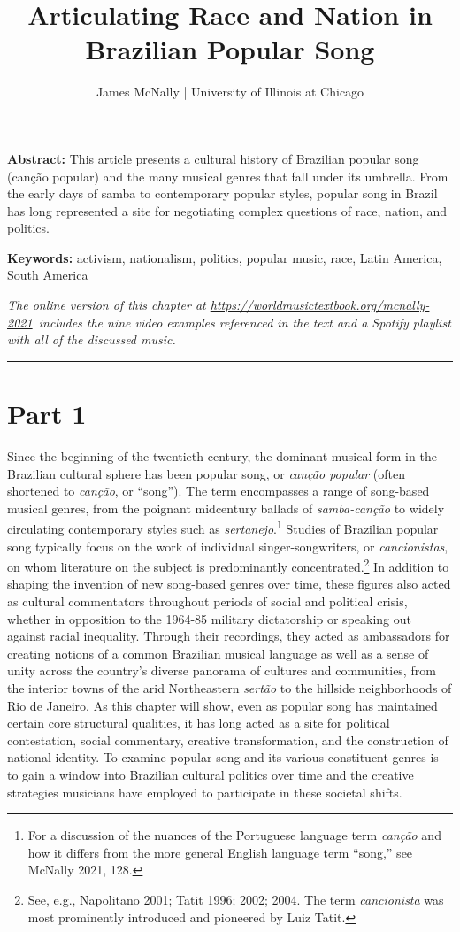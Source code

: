 \documentclass[twoside]{article}
\title{Articulating Race and Nation in Brazilian Popular Song}
\author{James McNally | University of Illinois at Chicago}
\date{}
\makeatletter
\renewcommand{\maketitle}{\bgroup\setlength{\parindent}{0pt}
\begin{flushleft}
  \vspace*{3\baselineskip}
  \huge{\textbf{\@title}}

  \medskip
  
  \large{\@author}
\end{flushleft}\egroup
}
\providecommand{\abstracttext}[1]
{
  \noindent
  \textbf{Abstract:} #1
}
\providecommand{\keywords}[1]
{
  \newline
  \textbf{Keywords:} #1
}
\providecommand{\wmturl}{\href{https://worldmusictextbook.org/mcnally-2021}{https://worldmusictextbook.org/mcnally-2021}}
\providecommand{\wmturltext}{
  \noindent\emph{The online version of this chapter at \wmturl~includes the nine video examples referenced in the text and a Spotify playlist with all of the discussed music.}
}
\makeatother
\begin{document}
\suppressfloats %
\maketitle

\abstracttext{This article presents a cultural history of Brazilian popular song (canção popular) and the many musical genres that fall under its umbrella. From the early days of samba to contemporary popular styles, popular song in Brazil has long represented a site for negotiating complex questions of race, nation, and politics.}
\keywords{activism, nationalism, politics, popular music, race, Latin America, South America}

\smallskip

\wmturltext

\medskip

\noindent\hfil\rule{0.5\textwidth}{0.4pt}\hfil

\bigskip

\section*{Part 1}

Since the beginning of the twentieth century, the dominant musical form
in the Brazilian cultural sphere has been popular song, or \emph{canção
popular} (often shortened to \emph{canção}, or ``song''). The term
encompasses a range of song-based musical genres, from the poignant
midcentury ballads of \emph{samba-canção} to widely circulating
contemporary styles such as \emph{sertanejo}.\footnote{For a discussion
  of the nuances of the Portuguese language term \emph{canção} and how
  it differs from the more general English language term ``song,'' see
  McNally 2021, 128.} Studies of Brazilian popular song typically focus
on the work of individual singer-songwriters, or \emph{cancionistas}, on
whom literature on the subject is predominantly concentrated.\footnote{See,
  e.g., Napolitano 2001; Tatit 1996; 2002; 2004. The term
  \emph{cancionista} was most prominently introduced and pioneered by
  Luiz Tatit.} In addition to shaping the invention of new song-based
genres over time, these figures also acted as cultural commentators
throughout periods of social and political crisis, whether in opposition
to the 1964-85 military dictatorship or speaking out against racial
inequality. Through their recordings, they acted as ambassadors for
creating notions of a common Brazilian musical language as well as a
sense of unity across the country's diverse panorama of cultures and
communities, from the interior towns of the arid Northeastern
\emph{sertão} to the hillside neighborhoods of Rio de Janeiro. As this
chapter will show, even as popular song has maintained certain core
structural qualities, it has long acted as a site for political
contestation, social commentary, creative transformation, and the
construction of national identity. To examine popular song and its
various constituent genres is to gain a window into Brazilian cultural
politics over time and the creative strategies musicians have employed
to participate in these societal shifts.
\end{document}
